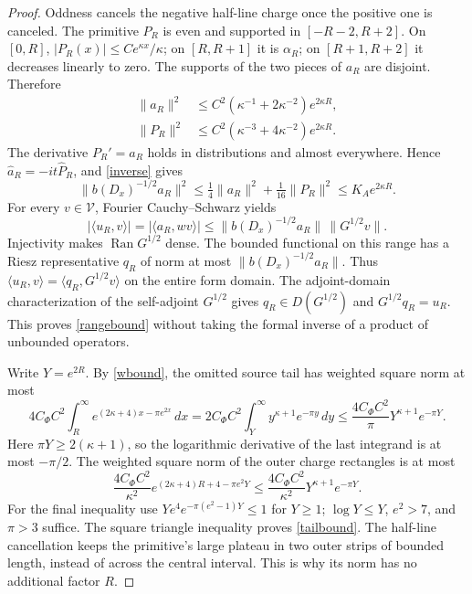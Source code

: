 \documentclass[11pt]{article}
\theoremstyle{remark}
\newcommand{\dd}{\,d}
\newcommand{\Ran}{\operatorname{Ran}}
\begin{document}
\begin{proof}
Oddness cancels the negative half-line charge once the positive one
is canceled. The primitive \(P_R\) is even and supported in
\([-R-2,R+2]\). On \([0,R]\),
\(|P_R(x)|\le Ce^{\kappa x}/\kappa\); on \([R,R+1]\) it is
\(\alpha_R\); on \([R+1,R+2]\) it decreases linearly to zero.
The supports of the two pieces of \(a_R\) are disjoint. Therefore
\begin{align*}
 \|a_R\|^2&\le C^2(\kappa^{-1}+2\kappa^{-2})e^{2\kappa R},\\
 \|P_R\|^2&\le C^2(\kappa^{-3}+4\kappa^{-2})e^{2\kappa R}.
\end{align*}
The derivative \(P_R'=a_R\) holds in distributions and almost
everywhere. Hence \(\widehat a_R=-it\widehat P_R\), and
\eqref{inverse} gives
\[
 \|b(D_x)^{-1/2}a_R\|^2
 \le\tfrac14\|a_R\|^2+\tfrac1{16}\|P_R\|^2
 \le K_Ae^{2\kappa R}.
\]
For every \(v\in\mathcal V\), Fourier Cauchy--Schwarz yields
\[
 |\langle u_R,v\rangle|
 =|\langle a_R,wv\rangle|
 \le\|b(D_x)^{-1/2}a_R\|\,\|G^{1/2}v\|.
\]
Injectivity makes \(\Ran G^{1/2}\) dense. The bounded functional
on this range has a Riesz representative \(q_R\) of norm at most
\(\|b(D_x)^{-1/2}a_R\|\). Thus
\(\langle u_R,v\rangle=\langle q_R,G^{1/2}v\rangle\)
on the entire form domain. The adjoint-domain characterization of
the self-adjoint \(G^{1/2}\) gives
\(q_R\in D(G^{1/2})\) and \(G^{1/2}q_R=u_R\).
This proves \eqref{rangebound} without taking the formal inverse
of a product of unbounded operators.

Write \(Y=e^{2R}\). By \eqref{wbound}, the omitted source tail has
weighted square norm at most
\[
 4C_\Phi C^2\int_R^\infty
 e^{(2\kappa+4)x-\pi e^{2x}}\dd x
 =2C_\Phi C^2\int_Y^\infty y^{\kappa+1}e^{-\pi y}\dd y
 \le\frac{4C_\Phi C^2}{\pi}Y^{\kappa+1}e^{-\pi Y}.
\]
Here \(\pi Y\ge2(\kappa+1)\), so the logarithmic derivative of
the last integrand is at most \(-\pi/2\).
The weighted square norm of the outer charge rectangles is at most
\[
 \frac{4C_\Phi C^2}{\kappa^2}
       e^{(2\kappa+4)R+4-\pi e^2Y}
 \le\frac{4C_\Phi C^2}{\kappa^2}Y^{\kappa+1}e^{-\pi Y}.
\]
For the final inequality use
\(Ye^4e^{-\pi(e^2-1)Y}\le1\) for \(Y\ge1\);
\(\log Y\le Y\), \(e^2>7\), and \(\pi>3\) suffice.
The square triangle inequality proves \eqref{tailbound}.
The half-line cancellation keeps the primitive's large plateau in
two outer strips of bounded length, instead of across the central
interval. This is why its norm has no additional factor \(R\).
\end{proof}
\end{document}
